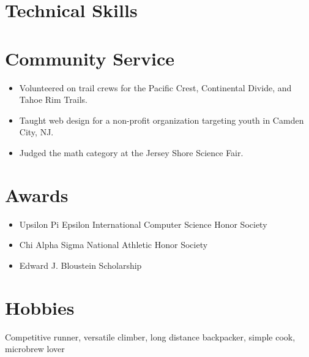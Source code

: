 \documentclass[10.5pt,a4paper,sans]{moderncv}        %
\begin{document}
\section{Technical Skills}

\section{Community Service}
\begin{itemize}
  \item Volunteered on trail crews for the Pacific Crest, Continental Divide, and Tahoe Rim Trails.
  \item Taught web design for a non-profit organization targeting youth in Camden City, NJ.
  \item Judged the math category at the Jersey Shore Science Fair.
\end{itemize}

\section{Awards}
\begin{itemize}
\item Upsilon Pi Epsilon International Computer Science Honor Society
\item Chi Alpha Sigma National Athletic Honor Society
\item Edward J. Bloustein Scholarship
\end{itemize}

\section{Hobbies}
Competitive runner, versatile climber, long distance backpacker, simple cook, microbrew lover


\clearpage
\end{document}
